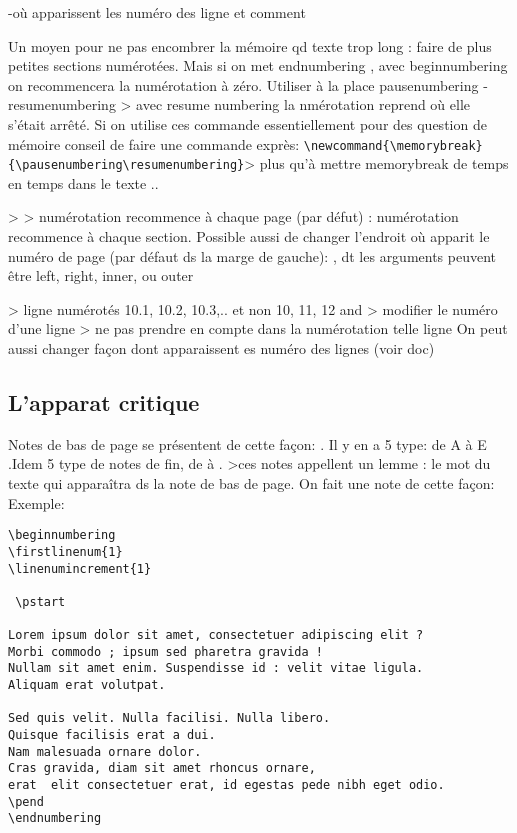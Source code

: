 -où apparissent les numéro des ligne et comment

Un moyen pour ne pas encombrer la mémoire qd texte trop long : faire de plus petites sections numérotées. Mais si on met endnumbering ,  avec beginnumbering on recommencera la numérotation à zéro.  Utiliser à la place pausenumbering - resumenumbering > avec resume numbering la nmérotation reprend où elle s'était arrêté. Si on utilise ces commande essentiellement pour des question de mémoire conseil de faire une commande exprès: \verb|\newcommand{\memorybreak}{\pausenumbering\resumenumbering}|> plus qu'à mettre memorybreak de temps en temps dans le texte ..

 >  > numérotation recommence à chaque page  (par défut) : numérotation recommence à chaque section.
Possible aussi de changer l'endroit où apparit le numéro de page (par défaut ds la marge de gauche): , dt les arguments peuvent être left, right, inner, ou outer

  > ligne numérotés 10.1, 10.2, 10.3,.. et non 10, 11, 12 
 and  > modifier le numéro d'une ligne 
 > ne pas prendre en compte dans la numérotation telle ligne
On peut aussi changer façon dont apparaissent es numéro des lignes (voir doc)


\subsection{L'apparat critique}

Notes de bas de page se présentent de cette façon:  . Il y en a 5 type: de A à E
.Idem 5 type de notes de fin, de  à .
>ces notes appellent un lemme : le mot du texte qui apparaîtra ds la  note de bas de page. On fait une note de cette façon: 
Exemple: 
\begin{verbatim}
\beginnumbering 
\firstlinenum{1}
\linenumincrement{1}

 \pstart 

Lorem ipsum dolor sit amet, consectetuer adipiscing elit ?
Morbi commodo ; ipsum sed pharetra gravida !
Nullam sit amet enim. Suspendisse id : velit vitae ligula.
Aliquam erat volutpat.

Sed quis velit. Nulla facilisi. Nulla libero. 
Quisque facilisis erat a dui. 
Nam malesuada ornare dolor.
Cras gravida, diam sit amet rhoncus ornare, 
erat  elit consectetuer erat, id egestas pede nibh eget odio.
\pend
\endnumbering
\end{verbatim}

